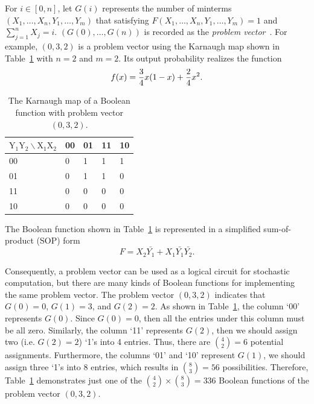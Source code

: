 \documentclass[conference,letterpaper]{IEEEtran}
\begin{document}
For $i\in[0,n]$, let $G(i)$ represents the number of minterms $(X_{1}, \ldots, X_{n}, Y_{1}, \ldots, Y_{m})$ that satisfying $F(X_{1}, \ldots, X_{n}, Y_{1}, \ldots, Y_{m})=1$ and $\sum_{j=1}^{n} X_{j}=i$. $(G(0), \ldots, G(n))$ is recorded as the \emph{problem vector}~\cite{Cube-Assignment}. For example, $(0, 3, 2)$ is a problem vector using the Karnaugh map shown in Table~\ref{tab:tt} with $n=2$ and $m=2$. Its output probability realizes the function
\begin{equation}
f(x)=\frac{3}{4} x(1-x)+\frac{2}{4} x^{2}.\vspace{-2ex}
\end{equation}


\begin{table}[htbp]
\setlength{\abovecaptionskip}{0.cm}
\setlength{\belowcaptionskip}{0.pt}
\setlength{\tabcolsep}{1mm}
\caption{The Karnaugh map of a Boolean function with problem vector $(0, 3, 2)$.}
\centering \label{tab:tt}
\begin{tabularx}{\linewidth}{lXXXX}
\toprule
$\mathrm{Y}_{1} \mathrm{Y}_{2} \backslash \mathrm{X}_{1} \mathrm{X}_{2}$ & 00 & 01 & 11 & 10 \\
\midrule
00 &0 & 1 & 1 & 1 \\
01 &0 & 1 & 1 &0 \\
11 &0 & 0& 0&0 \\
10 &0 &0 & 0&0 \\
\bottomrule
\end{tabularx}
\end{table}

The Boolean function shown in Table~\ref{tab:tt} is represented in a simplified sum-of-product (SOP) form
\begin{equation}
F=X_{2}\bar{Y_{1}}+X_{1} \bar{Y_{1}}\bar{Y_{2}}.
\end{equation}

Consequently, a problem vector can be used as a logical circuit for stochastic computation, but there are many kinds of Boolean functions for implementing the same problem vector.
The problem vector $(0, 3, 2)$ indicates that $G(0)=0$, $G(1)=3$, and $G(2)=2$.
As shown in Table~\ref{tab:tt}, the column `00' represents $G(0)$. Since $G(0)=0$, then all the entries under this column must be all zero.
Similarly, the column `11' represents $G(2)$, then we should assign two (i.e. $G(2)=2$) `1's into 4 entries. Thus, there are $\binom{4}{2}=6$ potential assignments.
Furthermore, the columns `01' and `10' represent $G(1)$, we should assign three `1's into 8 entries, which results in $\binom{8}{3}=56$ possibilities.
Therefore, Table~\ref{tab:tt} demonstrates just one of the $\binom{4}{2} \times \binom{8}{3} = 336$ Boolean functions of the problem vector $(0, 3, 2)$.
\end{document}
